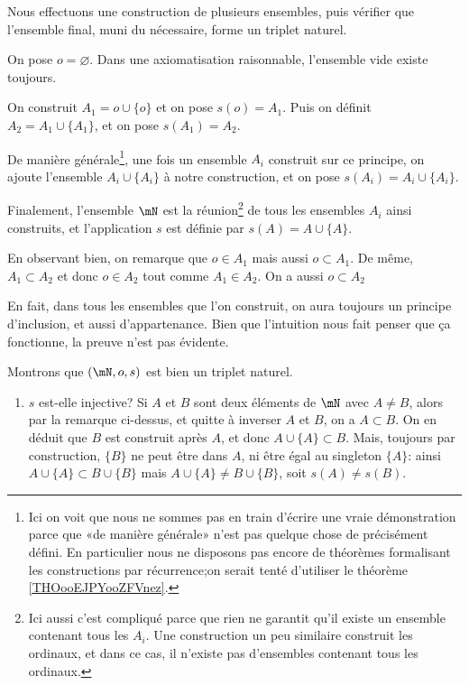 \begin{normaltext}	\label{NORMooConstructionTripletNaturel}

	Nous effectuons une construction de plusieurs ensembles, puis vérifier que l'ensemble final, muni du nécessaire, forme un triplet naturel.

	\begin{subproof}
		On pose \( o = \varnothing \). Dans une axiomatisation raisonnable, l'ensemble vide existe toujours.

		On construit \( A_1 = o \cup \{ o \} \) et on pose \( s(o) = A_1 \).
		Puis on définit \( A_2 = A_1 \cup \{ A_1 \} \), et on pose \( s(A_1) = A_2 \).

		De manière générale\footnote{Ici on voit que nous ne sommes pas en train d'écrire une vraie démonstration parce que «de manière générale» n'est pas quelque chose de précisément défini. En particulier nous ne disposons pas encore de théorèmes formalisant les constructions par récurrence;on serait tenté d'utiliser le théorème \ref{THOooEJPYooZFVnez}.}, une fois un ensemble \( A_i \) construit sur ce principe, on ajoute l'ensemble \( A_i \cup \{ A_i \} \) à notre construction, et on pose \( s(A_i) = A_i \cup \{ A_i \} \).

		Finalement, l'ensemble \( \mN \) est la réunion\footnote{Ici aussi c'est compliqué parce que rien ne garantit qu'il existe un ensemble contenant tous les \( A_i\). Une construction un peu similaire construit les ordinaux, et dans ce cas, il n'existe pas d'ensembles contenant tous les ordinaux.} de tous les ensembles \( A_i \) ainsi construits, et l'application \( s \) est définie par  \( s(A) = A \cup \{ A \} \).

		En observant bien, on remarque que \( o \in A_1 \) mais aussi \( o \subset A_1 \). De même, \( A_1 \subset A_2 \) et donc \( o \in A_2 \) tout comme \( A_1 \in A_2 \). On a aussi \( o \subset A_2 \)

		En fait, dans tous les ensembles que l'on construit, on aura toujours un principe d'inclusion, et aussi d'appartenance. Bien que l'intuition nous fait penser que ça fonctionne, la preuve n'est pas évidente.

		Montrons que  \( (\mN, o, s)\) est bien un triplet naturel.
		\begin{enumerate}
			\item \( s \) est-elle injective? Si \( A \) et \( B \) sont deux éléments de \( \mN \) avec \( A \neq B \), alors par la remarque ci-dessus, et quitte à inverser \( A \) et \( B \), on a \( A \subset B \). On en déduit que \( B \) est construit après \( A \), et donc \( A \cup \{ A \} \subset B \). Mais, toujours par construction, \( \{ B \} \)  ne peut être dans \( A \), ni être égal au singleton \( \{ A \} \): ainsi \( A \cup \{ A \} \subset B \cup \{ B \} \) mais \( A \cup \{ A \} \neq B \cup \{ B \} \), soit \( s(A) \neq s(B) \).


\end{enumerate}
\end{subproof}
\end{normaltext}
